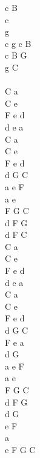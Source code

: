 \documentclass[a5paper, 10pt]{book}
\begin{document}
\begin{minipage}[t]{0.2\textwidth}
 c B\\
 c\\
 g\\
 c g c B\\
 c B G\\
 g C\\
 \\
 C a\\
 C e\\
 F e d\\
 d e a\vspace*{1.5mm}\\
 C a\\
 C e\\
F e d\\
d G C\\

 a e F\\
 a e\\
 F G C\\
 d F G\\
 d F C\\

 C a\\
 C e\\
 F e d\\
 d e a\vspace*{1.5mm}\\
 C a\\
 C e\\
F e d\\
d G C\\
 
F e a\\
 d G\vspace*{1.5mm}\\
  a e F\\
 a e\\
 F G C\\
 d F G\vspace*{1.5mm}\\
 d G\\
 e F\\
a\\
e F G C\\
\end{minipage}

\newpage
\end{document}
